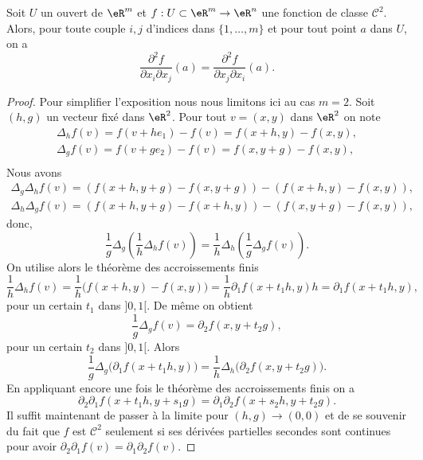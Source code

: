 \begin{theorem}[Schwarz]\label{Schwarz}
 Soit $U$ un ouvert de $\eR^m$ et  $f:U\subset\eR^m\to \eR^n$ une fonction de classe $\mathcal{C}^2$. Alors, pour toute couple $i,j$ d'indices dans $\{1,\ldots, m\}$ et pour tout point $a$ dans $U$, on a 
\[
\frac{\partial^2 f}{\partial  x_i\partial x_j}(a)=\frac{\partial^2 f}{\partial  x_j\partial x_i}(a).
\]
\end{theorem}
\begin{proof}
  Pour simplifier l'exposition nous nous limitons ici au cas $m=2$. Soit $(h,g)$ un vecteur fixé dans $\eR^2$. Pour tout  $v=(x,y)$ dans $\eR^2$ on note
  \begin{equation}
    \begin{array}{c}
      \Delta_h f(v)=f(v+he_1) -f(v) = f(x+h,y)-f(x,y),\\ 
      \Delta_g f(v)=f(v+ge_2) -f(v) = f(x,y+g)-f(x,y),\\ 
    \end{array}
  \end{equation}
Nous avons
\begin{equation}
  \begin{array}{c}
   \Delta_g   \Delta_h f(v)=\left(f(x+h,y+g)-f(x,y+g)\right)-\left(f(x+h,y)-f(x,y)\right),\\
   \Delta_h   \Delta_g f(v)=\left(f(x+h,y+g)-f(x+h,y)\right)-\left(f(x,y+g)-f(x,y)\right),
  \end{array}
\end{equation}
donc, 
\begin{equation}
  \frac{1}{g} \Delta_g  \left(\frac{1}{h} \Delta_h f(v)\right) = \frac{1}{h} \Delta_h \left(\frac{1}{g} \Delta_g f(v)\right).
\end{equation}
On utilise alors le théorème des accroissements finis
\[
\frac{1}{h} \Delta_h f(v)=\frac{1}{h}\big(f(x+h,y)-f(x,y)\big)=\frac{1}{h}\partial_1f(x+t_1h,y )h=\partial_1f(x+t_1h, y),
\]
pour un certain $t_1$ dans $]0,1[$. De même on obtient 
\[
\frac{1}{g} \Delta_g f(v)= \partial_2 f(x, y+t_2g),
\]
pour un certain $t_2$ dans $]0,1[$. Alors
 \begin{equation}
  \frac{1}{g} \Delta_g  \big(\partial_1f(x+t_1h, y)\big) = \frac{1}{h} \Delta_h \big(\partial_2 f(x, y+t_2g)\big).
\end{equation}
En appliquant encore une fois le théorème des accroissements finis on a
 \begin{equation}
  \partial_2\partial_1f(x+t_1h, y+s_1g) = \partial_1\partial_2 f(x+s_2h, y+t_2g).
\end{equation} 
Il suffit maintenant de passer à la limite pour $(h,g) \to (0,0)$ et de se souvenir du fait que $f$ est $\mathcal{C}^2$ seulement si ses dérivées partielles secondes sont continues pour avoir $\partial_2\partial_1f(v)=\partial_1\partial_2 f(v)$.
\end{proof}
